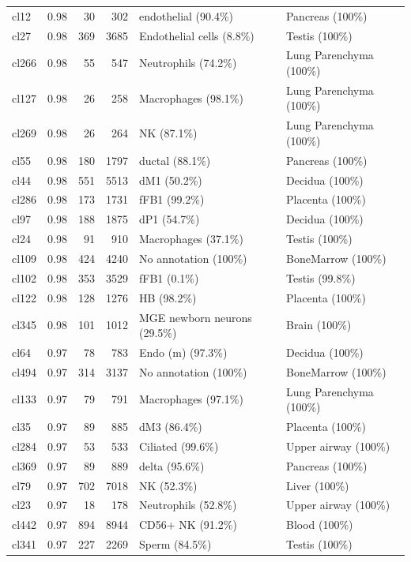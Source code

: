 \begin{table}[ht!]
\begin{tabular}{lrrrll}
  cl12 & 0.98 &  30 & 302 & endothelial (90.4\%) & Pancreas (100\%) \\ 
  cl27 & 0.98 & 369 & 3685 & Endothelial cells (8.8\%) & Testis (100\%) \\ 
  cl266 & 0.98 &  55 & 547 & Neutrophils (74.2\%) & Lung Parenchyma (100\%) \\ 
  cl127 & 0.98 &  26 & 258 & Macrophages (98.1\%) & Lung Parenchyma (100\%) \\ 
  cl269 & 0.98 &  26 & 264 & NK (87.1\%) & Lung Parenchyma (100\%) \\ 
  cl55 & 0.98 & 180 & 1797 & ductal (88.1\%) & Pancreas (100\%) \\ 
  cl44 & 0.98 & 551 & 5513 & dM1 (50.2\%) & Decidua (100\%) \\ 
  cl286 & 0.98 & 173 & 1731 & fFB1 (99.2\%) & Placenta (100\%) \\ 
  cl97 & 0.98 & 188 & 1875 & dP1 (54.7\%) & Decidua (100\%) \\ 
  cl24 & 0.98 &  91 & 910 & Macrophages (37.1\%) & Testis (100\%) \\ 
  cl109 & 0.98 & 424 & 4240 & No annotation (100\%) & BoneMarrow (100\%) \\ 
  cl102 & 0.98 & 353 & 3529 & fFB1 (0.1\%) & Testis (99.8\%) \\ 
  cl122 & 0.98 & 128 & 1276 & HB (98.2\%) & Placenta (100\%) \\ 
  cl345 & 0.98 & 101 & 1012 & MGE newborn neurons (29.5\%) & Brain (100\%) \\ 
  cl64 & 0.97 &  78 & 783 & Endo (m) (97.3\%) & Decidua (100\%) \\ 
  cl494 & 0.97 & 314 & 3137 & No annotation (100\%) & BoneMarrow (100\%) \\ 
  cl133 & 0.97 &  79 & 791 & Macrophages (97.1\%) & Lung Parenchyma (100\%) \\ 
  cl35 & 0.97 &  89 & 885 & dM3 (86.4\%) & Placenta (100\%) \\ 
  cl284 & 0.97 &  53 & 533 & Ciliated (99.6\%) & Upper airway (100\%) \\ 
  cl369 & 0.97 &  89 & 889 & delta (95.6\%) & Pancreas (100\%) \\ 
  cl79 & 0.97 & 702 & 7018 & NK (52.3\%) & Liver (100\%) \\ 
  cl23 & 0.97 &  18 & 178 & Neutrophils (52.8\%) & Upper airway (100\%) \\ 
  cl442 & 0.97 & 894 & 8944 & CD56+ NK (91.2\%) & Blood (100\%) \\ 
  cl341 & 0.97 & 227 & 2269 & Sperm (84.5\%) & Testis (100\%) \\ 

\end{tabular}
\end{table}
